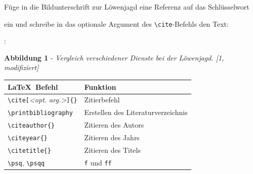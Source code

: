 \documentclass["WS\space 16-17\space -\space LaTeX-Kurs\space -\space Praesentation\space -\space 3.tex"]{subfiles}
\begin{document}
\begin{frame}[fragile]
  \Aufgabee
		Füge in die Bildunterschrift zur Löwenjagd eine Referenz auf das Schlüsselwort

    \textrm{}

    ein und schreibe in das optionale Argument des \lstinline[basicstyle=\normalfont\normalsize]|\cite|-Befehls den Text:

    \textrm{}:

	\begin{outputbox}
		\vspace{-0.3cm}
		\begin{center}
			\textbf{Abbildung 1} - \textit{Vergleich verschiedener Dienste bei der Löwenjagd. [1, modifiziert]}
		\end{center}
		\vspace{-0.3cm}
	\end{outputbox}
	\btVFill\Befehle
	\begin{center}
		\begin{tabular}{ll}
			\toprule
			\LaTeX\ Befehl							&	Funktion					\\ \midrule
			\lstinline|\cite[|\textit{\tiny{<opt. arg.>}}\lstinline|]{}|					&	Zitierbefehl\\
			\lstinline|\printbibliography|			&	Erstellen des Literaturverzeichnis\\
			\lstinline|\citeauthor{}|				&	Zitieren des Autors \\
			\lstinline|\citeyear{}|					&	Zitieren des Jahrs \\
			\lstinline|\citetitle{}|				&	Zitieren des Titels \\
			\lstinline|\psq|, \lstinline|\psqq|		&	\texttt{f} und \texttt{ff} \\
			\bottomrule
		\end{tabular}
	\end{center}
	\vspace{0.1cm}
\end{frame}
\end{document}
